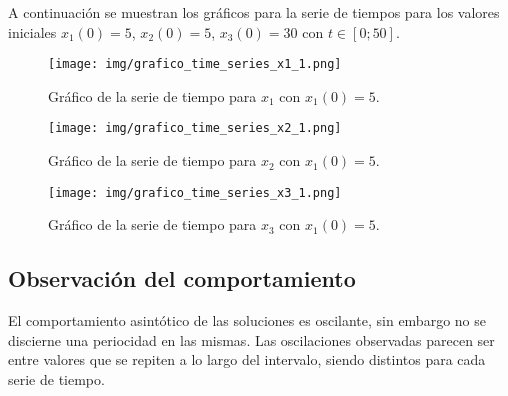 
A continuación se muestran los gráficos para la serie de tiempos para los valores iniciales $x_{1}(0) = 5$, $x_{2}(0) = 5$, $x_{3}(0) = 30$ con $t \in [0; 50]$.


\begin{figure}[!h] %
\begin{center}
\texttt{[image: img/grafico\_time\_series\_x1\_1.png]} %
\caption{\label{fig:fig_ts_x1_iv1}\footnotesize{Gráfico de la serie de tiempo para $x_{1}$ con $x_{1}(0) = 5$.}}
\end{center}
\end{figure}


\begin{figure}[!h] %
\begin{center}
\texttt{[image: img/grafico\_time\_series\_x2\_1.png]} %
\caption{\label{fig:fig_ts_x2_iv1}\footnotesize{Gráfico de la serie de tiempo para $x_{2}$ con $x_{1}(0) = 5$.}}
\end{center}
\end{figure}


\begin{figure}[!h] %
\begin{center}
\texttt{[image: img/grafico\_time\_series\_x3\_1.png]} %
\caption{\label{fig:fig_ts_x3_iv1}\footnotesize{Gráfico de la serie de tiempo para $x_{3}$ con $x_{1}(0) = 5$.}}
\end{center}
\end{figure}

\clearpage


\subsection{Observación del comportamiento}

El comportamiento asintótico de las soluciones es oscilante, sin embargo no se discierne una periocidad en las mismas. Las oscilaciones observadas parecen ser entre valores que se repiten a lo largo del intervalo, siendo distintos para cada serie de tiempo. 